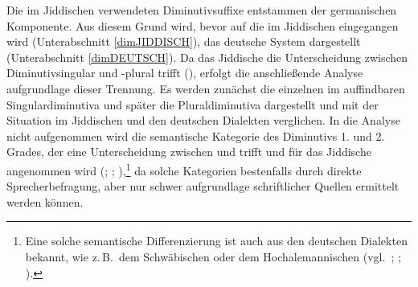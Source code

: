 Die im Jiddischen verwendeten Diminutivsuffixe entstammen der germanischen Komponente. Aus diesem Grund wird, bevor auf die  im Jiddischen eingegangen wird (Unterabschnitt \ref{dimJIDDISCH}), das deutsche System dargestellt (Unterabschnitt \ref{dimDEUTSCH}). Da das Jiddische die Unterscheidung zwischen Diminutivsingular und -plural trifft (\citealt[162–166]{Jacobs2005}), erfolgt die anschließende Analyse aufgrundlage dieser Trennung. Es werden zunächst die einzelnen im \hai{{\LiJi}}  auffindbaren Singulardiminutiva  und später die Pluraldiminutiva dargestellt und mit der Situation im Jiddischen und den deutschen Dialekten verglichen. In die Analyse nicht aufgenommen wird die semantische Kategorie des Diminutivs 1. und 2. Grades, der eine Unterscheidung zwischen  und  trifft und für das Jiddische angenommen wird (\citealt[48]{Landau1895}; \citealt[80]{Perlmutter1988}; \citealt[162]{Jacobs2005}),\footnote{Eine solche semantische Differenzierung ist auch aus den deutschen Dialekten bekannt, wie z.\,B.\, dem Schwäbischen oder dem Hochalemannischen (vgl.\, \citealt[1250]{Seebold1983}; \citealt[159–208]{Luessy1974}; \citealt[162]{Schirmunski1962}).} da solche Kategorien bestenfalls durch direkte Sprecherbefragung, aber nur schwer aufgrundlage schriftlicher Quellen ermittelt werden können.





